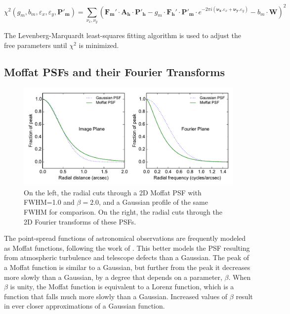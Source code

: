 \documentclass[12pt,twoside,a4paper]{article}
\newcommand{\Mepsf}{\mathbf{P'_m}}
\newcommand{\Hepsf}{\mathbf{P'_h}}
\newcommand{\Hlpf}{\mathbf{A_h}}
\newcommand{\Mimg}{\mathbf{F_m}}
\newcommand{\Himg}{\mathbf{F_h}}
\newcommand{\Mdxy}{e^{-2\pi i(\bm{\nu_x}.\varepsilon_x + \bm{\nu_y}.\varepsilon_y)}}
\newcommand{\dx}{\varepsilon_x}
\newcommand{\dy}{\varepsilon_y}
\newcommand{\Wt}{\bm{W}}
\newcommand{\mgain}{g_m}
\newcommand{\mbg}{b_m}
\begin{document}
\begin{equation}
\chi^2(\mgain,\mbg,\dx,\dy,\Mepsf) = \sum_{\nu_x,\nu_y}\left(\Mimg' \cdot \Hlpf \cdot \Hepsf - \mgain\cdot \Himg' \cdot \Mepsf \cdot \Mdxy - \mbg\cdot\Wt\right)^2
\end{equation}

The Levenberg-Marquardt least-squares fitting algorithm is used to
adjust the free parameters until $\chi^2$ is minimized.

\subsection{Moffat PSFs and their Fourier Transforms}

\begin{figure}[htbp]
\begin{center}
\begin{minipage}[b]{5.5in}
\begin{center}
\includegraphics[width=4.5in]{psf_fft.pdf}
\caption{On the left, the radial cuts through a 2D Moffat PSF with
  FWHM=1.0 and $\beta=2.0$, and a Gaussian profile of the same FWHM
  for comparison.  On the right, the radial cuts through the 2D
  Fourier transforms of these PSFs.}
\label{moffat_psf_figure}
\end{center}
\end{minipage}
\end{center}
\end{figure}

The point-spread functions of astronomical observations are frequently
modeled as Moffat functions, following the work of
\cite{moffat1969}. This better models the PSF resulting from
atmospheric turbulence and telescope defects than a Gaussian. The peak
of a Moffat function is similar to a Gaussian, but further from the
peak it decreases more slowly than a Gaussian, by a degree that
depends on a parameter, $\beta$. When $\beta$ is unity, the Moffat
function is equivalent to a Lorenz function, which is a function that
falls much more slowly than a Gaussian. Increased values of $\beta$
result in ever closer approximations of a Gaussian function.
\end{document}
